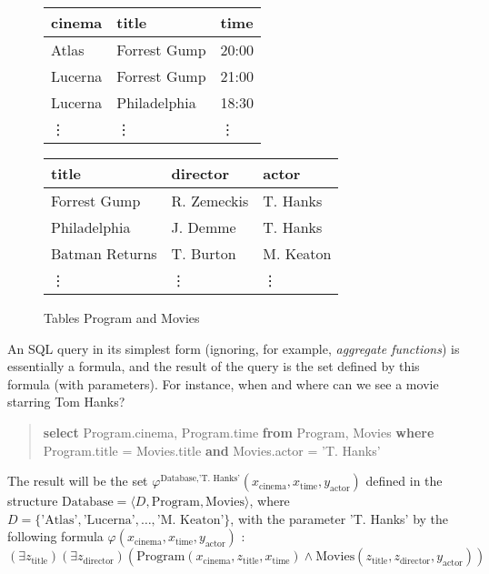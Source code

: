 \begin{figure}[htbp]
\begin{multicols}{2}
    \ttfamily\small
    \begin{tabular}{lll}
        cinema         & title          & time   \\ \hline
        Atlas          & Forrest Gump   & 20:00  \\
        Lucerna        & Forrest Gump   & 21:00  \\
        Lucerna        & Philadelphia   & 18:30  \\
        \vdots         & \vdots         & \vdots
    \end{tabular}

    \begin{tabular}{lll}
        title          & director    & actor \\ \hline
        Forrest Gump   & R. Zemeckis & T. Hanks      \\
        Philadelphia   & J. Demme    & T. Hanks      \\
        Batman Returns & T. Burton   & M. Keaton     \\
        \vdots         & \vdots      & \vdots
    \end{tabular}    
\end{multicols}
\caption{Tables Program and Movies}
\label{figure:database}
\end{figure}

An SQL query in its simplest form (ignoring, for example, \emph{aggregate functions}) is essentially a formula, and the result of the query is the set defined by this formula (with parameters). For instance, when and where can we see a movie starring Tom Hanks?

\begin{quote}
    \textbf{select} Program.cinema, Program.time \textbf{from} Program, Movies \textbf{where}\\ Program.title = Movies.title  \textbf{and} Movies.actor = 'T. Hanks'   
\end{quote}

The result will be the set $\varphi^{\text{Database},\text{'T. Hanks'}} (x_\mathrm{cinema},x_\mathrm{time},y_\mathrm{actor})$ defined in the structure $\text{Database}=\langle D, \mathrm{Program}, \mathrm{Movies}\rangle$, where $D=\{\text{'Atlas'},\text{'Lucerna'},\dots,\text{'M. Keaton'}\}$, with the parameter 'T. Hanks' by the following formula $\varphi(x_\mathrm{cinema},x_\mathrm{time},y_\mathrm{actor})$ :
$$
(\exists z_\mathrm{title})(\exists z_\mathrm{director})(\mathrm{Program}(x_\mathrm{cinema},z_\mathrm{title},x_\mathrm{time}) \land \mathrm{Movies}(z_\mathrm{title},z_\mathrm{director},y_\mathrm{actor}))
$$


